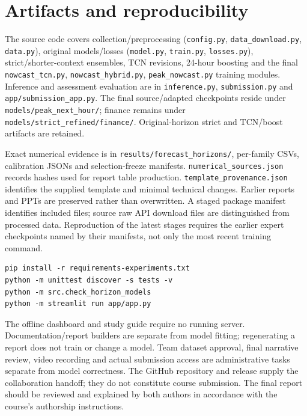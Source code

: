 \section{Artifacts and reproducibility}
The source code covers collection/preprocessing (\texttt{config.py}, \texttt{data\_download.py}, \texttt{data.py}), original models/losses (\texttt{model.py}, \texttt{train.py}, \texttt{losses.py}), strict/shorter-context ensembles, TCN revisions, 24-hour boosting and the final \texttt{nowcast\_tcn.py}, \texttt{nowcast\_hybrid.py}, \texttt{peak\_nowcast.py} training modules. Inference and assessment evaluation are in \texttt{inference.py}, \texttt{submission.py} and \texttt{app/submission\_app.py}. The final source/adapted checkpoints reside under \texttt{models/peak\_next\_hour/}; finance remains under \texttt{models/strict\_refined/finance/}. Original-horizon strict and TCN/boost artifacts are retained.

Exact numerical evidence is in \texttt{results/forecast\_horizons/}, per-family CSVs, calibration JSONs and selection-freeze manifests. \texttt{numerical\_sources.json} records hashes used for report table production. \texttt{template\_provenance.json} identifies the supplied template and minimal technical changes. Earlier reports and PPTs are preserved rather than overwritten. A staged package manifest identifies included files; source raw API download files are distinguished from processed data. Reproduction of the latest stages requires the earlier expert checkpoints named by their manifests, not only the most recent training command.

\begin{verbatim}
pip install -r requirements-experiments.txt
python -m unittest discover -s tests -v
python -m src.check_horizon_models
python -m streamlit run app/app.py
\end{verbatim}
The offline dashboard and study guide require no running server. Documentation/report builders are separate from model fitting; regenerating a report does not train or change a model. Team dataset approval, final narrative review, video recording and actual submission access are administrative tasks separate from model correctness. The GitHub repository and release supply the collaboration handoff; they do not constitute course submission. The final report should be reviewed and explained by both authors in accordance with the course's authorship instructions.

